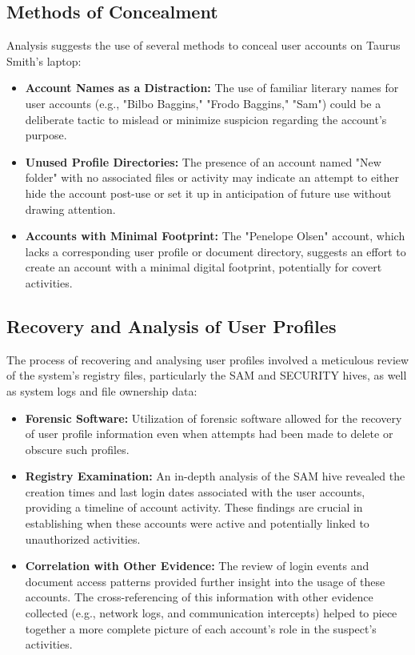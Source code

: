 \subsection{Methods of Concealment}
Analysis suggests the use of several methods to conceal user accounts on Taurus Smith's laptop:
\begin{itemize}
    \item \textbf{Account Names as a Distraction:} The use of familiar literary names for user accounts (e.g., "Bilbo Baggins," "Frodo Baggins," "Sam") could be a deliberate tactic to mislead or minimize suspicion regarding the account's purpose.
    \item \textbf{Unused Profile Directories:} The presence of an account named "New folder" with no associated files or activity may indicate an attempt to either hide the account post-use or set it up in anticipation of future use without drawing attention.
    \item \textbf{Accounts with Minimal Footprint:} The "Penelope Olsen" account, which lacks a corresponding user profile or document directory, suggests an effort to create an account with a minimal digital footprint, potentially for covert activities.
\end{itemize}

\subsection{Recovery and Analysis of User Profiles}
The process of recovering and analysing user profiles involved a meticulous review of the system's registry files, particularly the SAM and SECURITY hives, as well as system logs and file ownership data:
\begin{itemize}
    \item \textbf{Forensic Software:} Utilization of forensic software allowed for the recovery of user profile information even when attempts had been made to delete or obscure such profiles.
    \item \textbf{Registry Examination:} An in-depth analysis of the SAM hive revealed the creation times and last login dates associated with the user accounts, providing a timeline of account activity. These findings are crucial in establishing when these accounts were active and potentially linked to unauthorized activities.
    \item \textbf{Correlation with Other Evidence:} The review of login events and document access patterns provided further insight into the usage of these accounts. The cross-referencing of this information with other evidence collected (e.g., network logs, and communication intercepts) helped to piece together a more complete picture of each account's role in the suspect's activities.
\end{itemize}

